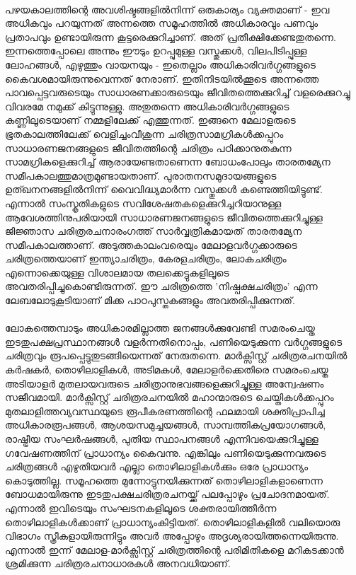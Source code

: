 \paragraph{}		പഴയകാലത്തിന്റെ അവശിഷ്ടങ്ങളിൽനിന്ന് ഒരുകാര്യം വ്യക്തമാണ് - ഇവ അധികവും പറയുന്നത് അന്നത്തെ സമൂഹത്തിൽ അധികാരവും പണവും പ്രതാപവും ഉണ്ടായിരുന്ന കൂട്ടരെക്കുറിച്ചാണ്. അത് പ്രതീക്ഷിക്കേണ്ടതുതന്നെ. ഇന്നത്തെപ്പോലെ അന്നും ഈടും ഉറപ്പുമുള്ള വസ്തുക്കൾ, വിലപിടിപ്പുള്ള ലോഹങ്ങൾ, എഴുത്തും വായനയും - ഇതെല്ലാം അധികാരിവർഗ്ഗങ്ങളുടെ കൈവശമായിരുന്നുവെന്നത് നേരാണ്. ഇതിനിടയിൽക്കൂടെ അന്നത്തെ പാവപ്പെട്ടവരുടെയും സാധാരണക്കാരുടെയും ജീവിതത്തെക്കുറിച്ച് വളരെക്കുറച്ചു വിവരമേ നമുക്ക് കിട്ടുന്നുള്ളു. അതുതന്നെ അധികാരിവർഗ്ഗങ്ങളുടെ കണ്ണിലൂടെയാണ് നമ്മളിലേക്ക് എത്തുന്നത്. ഇങ്ങനെ മേലാളരുടെ ഭൂതകാലത്തിലേക്ക് വെളിച്ചംവീശുന്ന ചരിത്രസാമഗ്രികൾക്കപ്പുറം സാധാരണജനങ്ങളുടെ ജീവിതത്തിന്റെ ചരിത്രം പഠിക്കാനുതകുന്ന സാമഗ്രികളെക്കുറിച്ച് ആരായേണ്ടതാണെന്ന ബോധംപോലും താരതമ്യേന സമീപകാലത്തുമാത്രമുണ്ടായതാണ്. പുരാതനസമുദായങ്ങളുടെ ഉത്ഖനനങ്ങളിൽനിന്ന് വൈവിദ്ധ്യമാർന്ന വസ്തുക്കൾ കണ്ടെത്തിയിട്ടുണ്ട്. എന്നാൽ സംസ്കൃതികളുടെ സവിശേഷതകളെക്കുറിച്ചറിയാനുള്ള ആവേശത്തിനുപരിയായി സാധാരണജനങ്ങളുടെ ജീവിതത്തെക്കുറിച്ചുള്ള ജിജ്ഞാസ ചരിത്രരചനാരംഗത്ത് സാർവ്വത്രികമായത് താരതമ്യേന സമീപകാലത്താണ്. അടുത്തകാലംവരെയും മേലാളവർഗ്ഗക്കാരുടെ ചരിത്രത്തെയാണ് ഇന്ത്യാചരിത്രം, കേരളചരിത്രം, ലോകചരിത്രം എന്നൊക്കെയുള്ള വിശാലമായ തലക്കെട്ടുകളിലൂടെ അവതരിപ്പിച്ചുകൊണ്ടിരുന്നത്. ഈ ചരിത്രത്തെ 'നിഷ്പക്ഷചരിത്രം' എന്ന ലേബലോടുകൂടിയാണ് മിക്ക പാഠപുസ്തകങ്ങളും അവതരിപ്പിക്കുന്നത്.

\paragraph{}	ലോകത്തെമ്പാടും അധികാരമില്ലാത്ത ജനങ്ങൾക്കുവേണ്ടി സമരംചെയ്ത ഇടതുപക്ഷപ്രസ്ഥാനങ്ങൾ വളർന്നതിനൊപ്പം, പണിയെടുക്കുന്ന വർഗ്ഗങ്ങളുടെ ചരിത്രവും രൂപപ്പെട്ടുതുടങ്ങിയെന്നത് നേരുതന്നെ. മാർക്സിസ്റ്റ് ചരിത്രരചനയിൽ കർഷകർ, തൊഴിലാളികൾ, അടിമകൾ, മേലാളർക്കെതിരെ സമരംചെയ്ത അടിയാളർ മുതലായവരുടെ ചരിത്രാനുഭവങ്ങളെക്കുറിച്ചുള്ള അന്വേഷണം സജീവമായി. മാർക്സിസ്റ്റ് ചരിത്രരചനയിൽ മഹാന്മാരുടെ ചെയ്തികൾക്കപ്പുറം മുതലാളിത്തവ്യവസ്ഥയുടെ രൂപീകരണത്തിന്റെ ഫലമായി ശക്തിപ്രാപിച്ച അധികാരരൂപങ്ങൾ, ആശയസമുച്ചയങ്ങൾ, സാമ്പത്തികപ്രയോഗങ്ങൾ, രാഷ്ട്രീയ സംഘർഷങ്ങൾ, പുതിയ സ്ഥാപനങ്ങൾ എന്നിവയെക്കുറിച്ചുള്ള ഗവേഷണത്തിന് പ്രാധാന്യം കൈവന്നു. എങ്കിലും പണിയെടുക്കുന്നവരുടെ ചരിത്രങ്ങൾ എഴുതിയവർ എല്ലാ തൊഴിലാളികൾക്കും ഒരേ പ്രാധാന്യം കൊടുത്തില്ല. സമൂഹത്തെ മുന്നോട്ടുനയിക്കുന്നത് തൊഴിലാളികളാണെന്ന ബോധമായിരുന്നു ഇടതുപക്ഷചരിത്രരചനയ്ക്ക് പലപ്പോഴും പ്രചോദനമായത്. എന്നാൽ ഇവിടെയും സംഘടനകളിലൂടെ ശക്തരായിത്തീർന്ന തൊഴിലാളികൾക്കാണ് പ്രാധാന്യംകിട്ടിയത്. തൊഴിലാളികളിൽ വലിയൊരു വിഭാഗം സ്ത്രീകളായിരുന്നിട്ടും അവർ അപ്പോഴും അദൃശ്യരായിത്തന്നെയിരുന്നു. എന്നാൽ ഇന്ന് മേലാള-മാർക്സിസ്റ്റ് ചരിത്രത്തിന്റെ പരിമിതികളെ മറികടക്കാൻ ശ്രമിക്കുന്ന ചരിത്രരചനാധാരകൾ അനവധിയാണ്.

